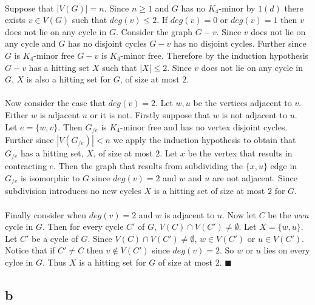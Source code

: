 \documentclass[letterpaper,12pt,oneside,onecolumn]{report}
\begin{document}
\paragraph{}
Suppose that $|V(G)| = n$. Since $n \geq 1$ and $G$ has no $K_4$-minor by $1(d)$ there exists $v \in V(G)$ such that $deg(v) \leq 2$. If $deg(v) = 0$ or $deg(v) = 1$ then $v$ does not lie on any cycle in $G$. Consider the graph $G - v$. Since $v$ does not lie on any cycle and $G$ has no disjoint cycles $G-v$ has no disjoint cycles. Further since $G$ is $K_4$-minor free $G-v$ is $K_4$-minor free. Therefore by the induction hypothesis $G-v$ has a hitting set $X$ such that $|X| \leq 2$. Since $v$ does not lie on any cycle in $G$, $X$ is also a hitting set for $G$, of size at most $2$.
\paragraph{}
Now consider the case that $deg(v) = 2$. Let $w, u$ be the vertices adjacent to $v$. Either $w$ is adjacent $u$ or it is not. Firstly suppose that $w$ is not adjacent to $u$. Let $e = \{w,v\}$. Then $G_{/e}$ is $K_4$-minor free and has no vertex disjoint cycles. Further since $|V(G_{/e})| < n$ we apply the induction hypothesis to obtain that $G_{/e}$ has a hitting set, $X$, of size at most $2$. Let $x$ be the vertex that results in contracting $e$. Then the graph that results from subdividing the $\{x, u\}$ edge in $G_{/e}$ is isomorphic to $G$ since $deg(v)=2$ and $w$ and $u$ are not adjacent. Since subdivision introduces no new cycles $X$ is a hitting set of size at most $2$ for $G$.
\paragraph{}
Finally consider when $deg(v) = 2$ and $w$ is adjacent to $u$. Now let $C$ be the $wvu$ cycle in $G$. Then for every cycle $C'$ of $G$, $V(C) \cap V(C') \neq \emptyset$. Let $X = \{w,u\}$. Let $C'$ be a cycle of $G$. Since $V(C) \cap V(C') \neq \emptyset$, $w \in V(C')$ or $u \in V(C')$. Notice that if $C' \neq C$ then $v \not \in V(C')$ since $deg(v) = 2$. So $w$ or $u$ lies on every cylce in $G$. Thus $X$ is a hitting set for $G$ of size at most $2$. $\blacksquare$
\subsection*{b}
\end{document}
